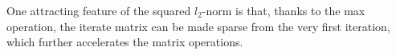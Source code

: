 


One attracting feature of the squared $l_2$-norm is that, thanks to the max operation,
the iterate matrix can be made sparse from the very first iteration,
which further accelerates the matrix operations.

